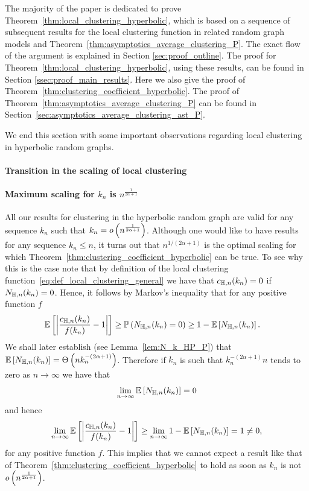 The majority of the paper is dedicated to prove Theorem~\ref{thm:local_clustering_hyperbolic}, which is based on a sequence of subsequent results for the local clustering function in related random graph models and Theorem~\ref{thm:asymptotics_average_clustering_P}. The exact flow of the argument is explained in Section \ref{sec:proof_outline}. The proof for Theorem~\ref{thm:local_clustering_hyperbolic}, using these results, can be found in Section \ref{ssec:proof_main_results}. Here we also give the proof of Theorem~\ref{thm:clustering_coefficient_hyperbolic}. The proof of Theorem~\ref{thm:asymptotics_average_clustering_P} can be found in Section~\ref{sec:asymptotics_average_clustering_ast_P}.

We end this section with some important observations regarding local clustering in hyperbolic random graphs.


\paragraph{Transition in the scaling of local clustering}

\paragraph{Maximum scaling for $k_n$ is $n^{\frac{1}{2\alpha +1}}$}
All our results for clustering in the hyperbolic random graph are valid for any sequence $k_n$ such that $k_n = o\left(n^{\frac{1}{2\alpha + 1}}\right)$. Although one would like to have results for any sequence $k_n \le n$, it turns out that $n^{1/(2\alpha + 1)}$ is the optimal scaling for which Theorem~\ref{thm:clustering_coefficient_hyperbolic} can be true. To see why this is the case note that by definition of the local clustering function~\eqref{eq:def_local_clustering_general} we have that $c_{\mathbb{H},n}(k_n) = 0$ if $N_{\mathbb{H},n}(k_n) = 0$. Hence, it follows by Markov's inequality that for any positive function $f$
\begin{align*}
	\mathbb{E}\left[\left|\frac{c_{\mathbb{H},n}(k_n)}{f(k_n)} - 1\right|\right] 
	&\ge \mathbb{P}\left(N_{\mathbb{H},n}(k_n) = 0\right) \ge 1 - \mathbb{E}\left[N_{\mathbb{H},n}(k_n)\right].
\end{align*}
We shall later establish (see Lemma~\ref{lem:N_k_HP_P}) that $\mathbb{E}\left[N_{\mathbb{H},n}(k_n)\right] = \Theta\left(n k_n^{-(2\alpha + 1)}\right)$. Therefore if $k_n$ is such that $k_n^{-(2\alpha + 1)} n$ tends to zero as $n \to \infty$ we have that 
\[
	\lim_{n \to \infty} \mathbb{E}\left[N_{\mathbb{H},n}(k_n)\right] = 0
\]
and hence
\[
	\lim_{n \to \infty} \mathbb{E}\left[\left|\frac{c_{\mathbb{H},n}(k_n)}{f(k_n)} - 1\right|\right] 
	\ge \lim_{n \to \infty} 1 - \mathbb{E}\left[N_{\mathbb{H},n}(k_n)\right] = 1 \ne 0,
\]
for any positive function $f$. This implies that we cannot expect a result like that of Theorem~\ref{thm:clustering_coefficient_hyperbolic} to hold as soon as $k_n$ is not $o\left(n^{\frac{1}{2\alpha + 1}}\right)$.


